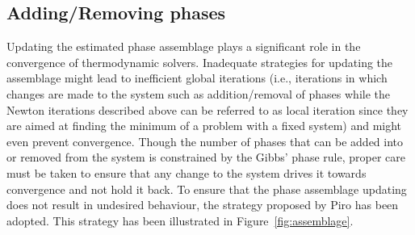 \subsection{Adding/Removing phases}
		Updating the estimated phase assemblage plays a significant role in the convergence of thermodynamic solvers. Inadequate strategies for updating the assemblage might lead to inefficient global iterations (i.e., iterations in which changes are made to the system such as addition/removal of phases while the Newton iterations described above can be referred to as local iteration since they are aimed at finding the minimum of a problem with a fixed system) and might even prevent convergence. Though the number of phases that can be added into or removed from the system is constrained by the Gibbs' phase rule, proper care must be taken to ensure that any change to the system drives it towards convergence and not hold it back. To ensure that the phase assemblage updating does not result in undesired behaviour, the strategy proposed by Piro \cite{Piro17} has been adopted. This strategy has been illustrated in Figure~\ref{fig:assemblage}.
